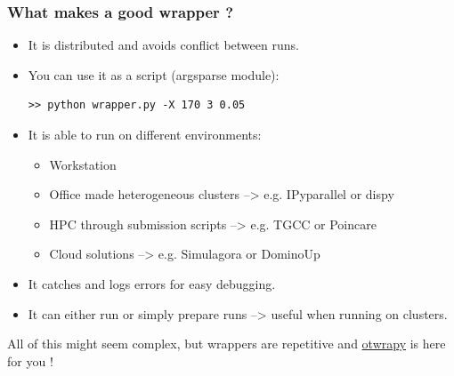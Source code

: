 \documentclass[10pt, aspectratio=169]{beamer}
\begin{document}
\begin{frame}[fragile]
\frametitle{What makes a good wrapper ?}
\begin{itemize}
\item It is distributed and avoids conflict between runs.
\item You can use it as a script (argsparse module):

\begin{Verbatim}[xleftmargin=10mm]
   >> python wrapper.py -X 170 3 0.05
\end{Verbatim}

\item It is able to run on different environments:
\begin{itemize}
\item Workstation
\item Office made heterogeneous clusters --> e.g. IPyparallel or dispy
\item HPC through submission scripts --> e.g. TGCC or Poincare
\item Cloud solutions --> e.g. Simulagora or DominoUp
\end{itemize}
\item It catches and logs errors for easy debugging.
\item It can either run or simply prepare runs --> useful when running on
  clusters.
\end{itemize}
All of this  might seem complex, but wrappers are repetitive and
\href{https://github.com/openturns/otwrapy}{otwrapy} is here for you !
\end{frame}
\end{document}
